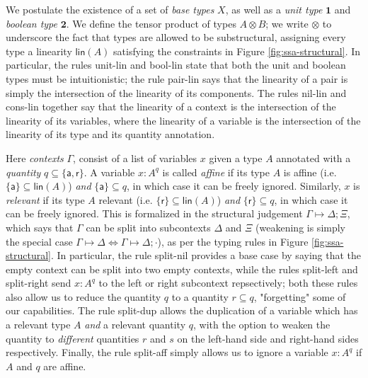 \documentclass[acmsmall,screen,review]{acmart}
\newcommand{\mb}[1]{\ensuremath{\mathbf{#1}}}
\newcommand{\ms}[1]{\ensuremath{\mathsf{#1}}}
\newcommand{\csplits}[3]{#1 \mapsto #2;#3}
\newcommand{\cwk}[2]{#1 \mapsto #2}
\newcommand{\tlin}[2]{#2 \subseteq \ms{lin}(#1)}
\newcommand{\rle}[1]{{\scriptsize\textsf{#1}}}
\newcommand{\taff}{{\{\ms{a}\}}}
\newcommand{\trel}{{\{\ms{r}\}}}
\newcommand{\tint}{{\{\ms{a}, \ms{r}\}}}
\begin{document}
We postulate the existence of a set of \textit{base types} \(X\), as well as a
\textit{unit type} \(\mb{1}\) and \textit{boolean type} \(\mb{2}\). We define
the tensor product of types \(A \otimes B\); we write \(\otimes\) to underscore
the fact that types are allowed to be substructural, assigning every type a
linearity \(\ms{lin}(A)\) satisfying the constraints in Figure
\ref{fig:ssa-structural}. In particular, the rules \rle{unit-lin} and
\rle{bool-lin} state that both the unit and boolean types must be
intuitionistic; the rule \rle{pair-lin} says that the linearity of a pair is
simply the intersection of the linearity of its components. The rules
\rle{nil-lin} and \rle{cons-lin} together say that the linearity of a context is
the intersection of the linearity of its variables, where the linearity of a
variable is the intersection of the linearity of its type and its quantity
annotation.

Here \textit{contexts} \(\Gamma\), consist of a list of variables \(x\) given a
type \(A\) annotated with a \textit{quantity} \(q \subseteq \tint\). A variable
\(x: A^q\) is called \textit{affine} if its type \(A\) is affine (i.e.
\(\tlin{A}{\taff}\)) \textit{and} \(\taff \subseteq q\), in which case it can be
freely ignored. Similarly, \(x\) is \textit{relevant} if its type \(A\) relevant
(i.e. \(\tlin{A}{\trel}\)) \textit{and} \(\trel \subseteq q\), in which case it
can be freely ignored. This is formalized in the structural judgement
\(\csplits{\Gamma}{\Delta}{\Xi}\), which says that \(\Gamma\) can be split into
subcontexts \(\Delta\) and \(\Xi\) (weakening is simply the special case
\(\cwk{\Gamma}{\Delta} \iff \csplits{\Gamma}{\Delta}{\cdot}\)), as per the
typing rules in Figure \ref{fig:ssa-structural}. In particular, the rule
\rle{split-nil} provides a base case by saying that the empty context can be
split into two empty contexts, while the rules \rle{split-left} and
\rle{split-right} send \(x: A^q\) to the left or right subcontext repsectively;
both these rules also allow us to reduce the quantity \(q\) to a quantity \(r
\subseteq q\), "forgetting" some of our capabilities. The rule \rle{split-dup}
allows the duplication of a variable which has a relevant type \(A\)
\textit{and} a relevant quantity \(q\), with the option to weaken the quantity
to \textit{different} quantities \(r\) and \(s\) on the left-hand side and
right-hand sides respectively. Finally, the rule \rle{split-aff} simply allows
us to ignore a variable \(x: A^q\) if \(A\) and \(q\) are affine.
\end{document}
